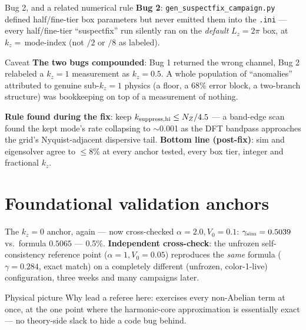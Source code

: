 \documentclass[aspectratio=169,11pt]{beamer}
\newenvironment{physpicture}{\begin{exampleblock}{Physical picture}}{\end{exampleblock}}
\newenvironment{caveat}{\begin{alertblock}{Caveat}}{\end{alertblock}}
\newcommand{\Vo}{V_0}
\newcommand{\kz}{k_z}
\begin{document}
\begin{frame}{Bug 2, and a related numerical rule}
\textbf{Bug 2}: \texttt{gen\_suspectfix\_campaign.py} defined half/fine-tier box
parameters but never emitted them into the \texttt{.ini} — every half/fine-tier
``suspectfix'' run silently ran on the \emph{default} $L_z=2\pi$ box, at
$\kz=$\,mode-index (not $/2$ or $/8$ as labeled).
\begin{caveat}
\textbf{The two bugs compounded}: Bug 1 returned the wrong channel, Bug 2
relabeled a $\kz=1$ measurement as $\kz=0.5$. A whole population of ``anomalies''
attributed to genuine sub-$\kz=1$ physics (a floor, a 68\% error block, a
two-branch structure) was bookkeeping on top of a measurement of nothing.
\end{caveat}
\textbf{Rule found during the fix}: keep $k_{\rm suppress,hi}\le N_Z/4.5$ — a
band-edge scan found the kept mode's rate collapsing to $\sim$0.001 as the
DFT bandpass approaches the grid's Nyquist-adjacent dispersive tail.
\vspace{0.1em}
\textbf{Bottom line (post-fix)}: sim and eigensolver agree to $\le$8\% at every
anchor tested, every box tier, integer and fractional $\kz$.
\end{frame}

\section{Foundational validation anchors}

\begin{frame}{The $\kz=0$ anchor, again --- now cross-checked}
$\alpha=2.0,\Vo=0.1$: $\gamma_{\rm sim}=0.5039$ vs.\ formula $0.5065$ — 0.5\%.
\vspace{0.1em}
\textbf{Independent cross-check}: the unfrozen self-consistency reference point
($\alpha=1,\Vo=0.05$) reproduces the \emph{same} formula
($\gamma=0.284$, exact match) on a completely different (unfrozen, color-1-live)
configuration, three weeks and many campaigns later.
\begin{physpicture}
Why lead a referee here: exercises every non-Abelian term at once, at the one
point where the harmonic-core approximation is essentially exact — no theory-side
slack to hide a code bug behind.
\end{physpicture}
\end{frame}
\end{document}
